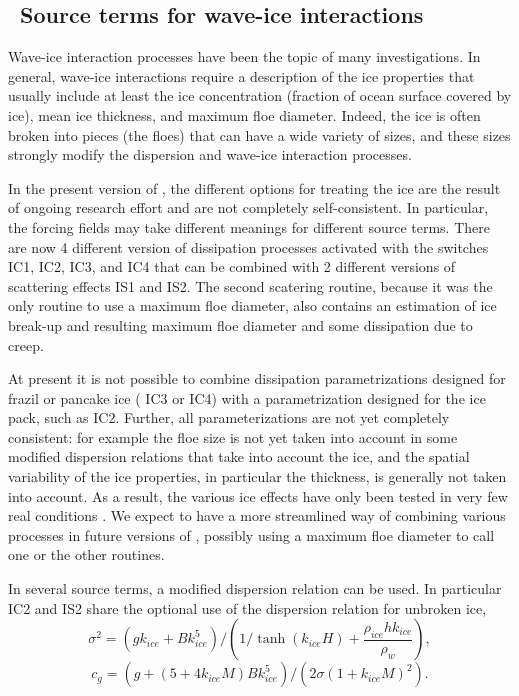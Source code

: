 \vssub
\subsection{~Source terms for wave-ice interactions}
\vsssub


Wave-ice interaction processes have been the topic of many investigations. In general, wave-ice interactions require 
a description of the ice properties that usually include at least the ice concentration (fraction of ocean surface covered by ice), 
mean ice thickness, and maximum floe diameter. Indeed, the ice is often broken into pieces (the floes) that can have a wide variety of sizes, 
and these sizes strongly modify the dispersion and wave-ice interaction processes. 


In the present version of \ww, the different options 
for treating the ice are the result of ongoing research effort and are not completely self-consistent. In particular, the forcing fields may take 
different meanings for different source terms. There are now 4 different 
version of dissipation processes activated with the switches {\code IC1}, {\code IC2},  {\code IC3}, and {\code IC4} that can be combined with 2 
different versions of scattering effects  {\code IS1} and {\code IS2}. The second scatering routine, because it was the only routine 
to use a maximum floe diameter, also contains an estimation of 
ice break-up and resulting maximum floe diameter and some dissipation due to creep. 


At present it is not possible to combine dissipation parametrizations designed for frazil or pancake ice (  {\code IC3} or {\code IC4}) with 
a parametrization designed for the ice pack, such  as {\code IC2}. Further, all parameterizations are not yet completely consistent: 
for example the floe size is not yet taken into account in some modified dispersion relations that take into account the ice, and 
the spatial variability of the ice properties, in particular the thickness, is generally not taken into account. As a result, 
the various ice effects have only been tested in very  few real conditions \citep[e.g.][]{art:Aea16}.
We expect to have a more streamlined way of combining various processes in future versions of \ww, possibly using 
a maximum floe diameter to call one or the other routines. 


In several source terms, a modified dispersion relation can be used. In particular {\code IC2} and {\code IS2} share 
the optional use of the \cite{art:LMC88} dispersion relation for unbroken ice, 
\begin{equation}
\sigma^2 =  \left(gk_{ice} + B k_{ice}^5\right)  / \left(1/\tanh ( k_{ice}H) +\frac{\rho_{ice}  h k_{ice}} {\rho_{w} }\right),
\end{equation}
\begin{equation}
c_g =  (g+(5 + 4 k_{ice} M)Bk_{ice}^5)/(2\sigma(1+k_{ice}M)^2).
\end{equation}

